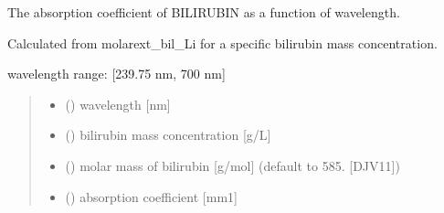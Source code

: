 \documentclass[letterpaper,10pt,english]{sphinxmanual}
\begin{document}
\begin{fulllineitems}
\label{\detokenize{03_absorption_coefficient:skinoptics.absorption_coefficient.mua_bil_Li}}
\pysigstartsignatures
{}
\pysigstopsignatures
\begin{DUlineblock}{0em}
\item[] The absorption coefficient of BILIRUBIN as a function of wavelength.
\item[] Calculated from molarext\_bil\_Li for a specific bilirubin mass concentration.
\end{DUlineblock}

\begin{DUlineblock}{0em}
\item[] wavelength range: {[}239.75 nm, 700 nm{]}
\end{DUlineblock}
\begin{quote}\begin{description}
\begin{itemize}
\item {} 
\sphinxAtStartPar
{} () \textendash{} wavelength {[}nm{]}

\item {} 
\sphinxAtStartPar
{} () \textendash{} bilirubin mass concentration {[}g/L{]}

\item {} 
\sphinxAtStartPar
{} () \textendash{} molar mass of bilirubin {[}g/mol{]} (default to 585. {[}DJV11{]})

\end{itemize}

\sphinxAtStartPar
\begin{itemize}
\item {} 
\sphinxAtStartPar
{} () \textendash{} absorption coefficient {[}mm\sphinxhyphen{}1{]}

\end{itemize}


\end{description}\end{quote}

\end{fulllineitems}
\end{document}
